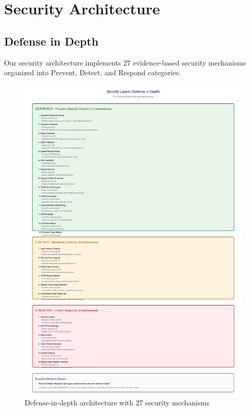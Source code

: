 \documentclass[12pt,a4paper]{article}
\begin{document}
\section{Security Architecture}

\subsection{Defense in Depth}

Our security architecture implements 27 evidence-based security mechanisms organized into Prevent, Detect, and Respond categories.

\begin{figure}[H]
    \centering
    \includegraphics[width=\textwidth]{diagrams/7_security_layers.png}
    \caption{Defense-in-depth architecture with 27 security mechanisms}
    \label{fig:security_layers}
\end{figure}
\end{document}
